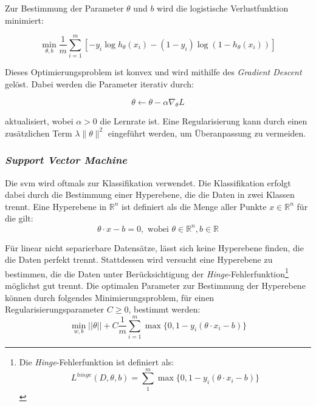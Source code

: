 Zur Bestimmung der Parameter $\theta$ und $b$ wird die logistische Verlustfunktion minimiert:

\begin{equation*}
    \min_{\theta, b} \frac{1}{m} \sum_{i=1}^{m} \left[-y_i \log h_{\theta}(x_i) - (1 - y_i) \log(1 - h_{\theta}(x_i))\right]
\end{equation*}

Dieses Optimierungsproblem ist konvex und wird mithilfe des \textit{Gradient Descent} gelöst. Dabei werden die Parameter iterativ durch:

\begin{equation*}
    \theta \leftarrow \theta - \alpha \nabla_{\theta} L
\end{equation*}

aktualisiert, wobei $\alpha > 0$ die Lernrate ist. Eine Regularisierung kann durch einen zusätzlichen Term $\lambda \lVert\theta\rVert^2$ eingeführt werden, um Überanpassung zu vermeiden.

\subsubsection{\textit{Support Vector Machine}}

Die \gls{svm} wird oftmals zur Klassifikation verwendet.
Die Klassifikation erfolgt dabei durch die Bestimmung einer Hyperebene, die die Daten in zwei Klassen trennt.
Eine Hyperebene in $\mathbb{R}^{n}$ ist definiert als die Menge aller Punkte $x\in\mathbb{R}^n$ für die gilt:
\begin{equation*}
    \theta \cdot x - b = 0, \text{ wobei } \theta \in \mathbb{R}^{n}, b\in\mathbb{R}
\end{equation*}

Für linear nicht separierbare Datensätze, lässt sich keine Hyperebene finden, die die Daten perfekt trennt.
Stattdessen wird versucht eine Hyperebene zu bestimmen, die die Daten unter Berücksichtigung der \textit{Hinge}-Fehlerfunktion\footnote{
    Die \textit{Hinge}-Fehlerfunktion ist definiert als:
    \begin{equation*}
        L^{hinge}(D, \theta, b) = \sum_{1}^{m}\max\lbrace0, 1 - y_i(\theta \cdot x_i - b)\rbrace
    \end{equation*}
} möglichst gut trennt.
Die optimalen Parameter zur Bestimmung der Hyperebene können durch folgendes Minimierungsproblem, für einen Regularisierungsparameter $C\geq0$, bestimmt werden:
\begin{equation*}
    \min_{w, b} \lvert\lvert \theta \rvert\rvert + C \frac{1}{m}\sum_{i=1}^{m} \max\lbrace0, 1 - y_i(\theta \cdot x_i - b)\rbrace
\end{equation*}

